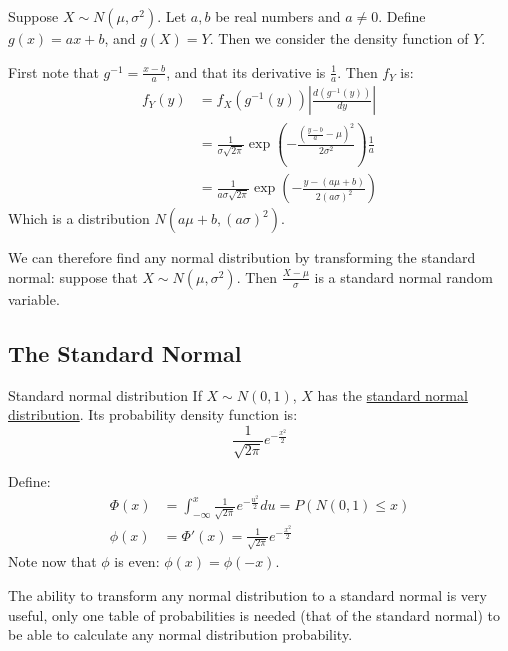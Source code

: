 \documentclass[../Main.tex]{subfiles}
\begin{document}
\begin{example}
    Suppose $X \sim N(\mu, \sigma^2)$. Let $a, b$ be real numbers and $a \neq 0$. Define $g(x) = ax + b$, and $g(X) = Y$. Then we consider the density function of $Y$.\par
    First note that $g^{-1} = \frac{x - b}{a}$, and that its derivative is $\frac{1}{a}$. Then $f_{Y}$ is:
    \begin{align*}
        f_Y(y) &= f_X (g^{-1}(y)) \left|\frac{d(g^{-1}(y))}{dy}\right| \\
        &= \frac{1}{\sigma\sqrt{2\pi}} \exp{\left(-\frac{\left(\frac{y - b}{a} - \mu\right)^2}{2\sigma^2}\right)} \frac{1}{a} \\
        &= \frac{1}{a\sigma\sqrt{2\pi}} \exp{\left(-\frac{y - (a\mu + b)}{2(a\sigma)^2}\right)}
    \end{align*}
    Which is a distribution $N(a\mu + b, (a\sigma)^2)$.\par
    We can therefore find any normal distribution by transforming the standard normal: suppose that $X \sim N(\mu, \sigma^2)$. Then $\frac{X - \mu}{\sigma}$ is a standard normal random variable.
\end{example}
\subsection{The Standard Normal}
\begin{definition}{Standard normal distribution}
    If $X \sim N(0, 1)$, $X$ has the \underline{standard normal distribution}. Its probability density function is:
    \begin{equation*}
        \frac{1}{\sqrt{2\pi}} e^{-\frac{x^2}{2}}
    \end{equation*}
\end{definition}
\begin{example}
    Define:
    \begin{align*}
        \Phi(x) &= \int_{-\infty}^x \frac{1}{\sqrt{2\pi}} e^{-\frac{u^2}{2}} du = P(N(0, 1) \leq x) \\
        \phi(x) &= \Phi'(x) = \frac{1}{\sqrt{2\pi}} e^{-\frac{x^2}{2}}
    \end{align*}
    Note now that $\phi$ is even: $\phi(x) = \phi(-x)$.
\end{example}
The ability to transform any normal distribution to a standard normal is very useful, only one table of probabilities is needed (that of the standard normal) to be able to calculate any normal distribution probability.
\end{document}
